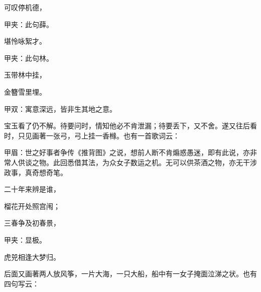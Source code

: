 \begin{poem}

    \begin{pl}可叹停机德，\end{pl}\begin{note}甲夹：此句薛。\end{note}

    \begin{pl}堪怜咏絮才。\end{pl}\begin{note}甲夹：此句林。\end{note}

    \begin{pl}玉带林中挂，\end{pl}

    \begin{pl}金簪雪里埋。\end{pl}\begin{note}甲双：寓意深远，皆非生其地之意。\end{note}

\end{poem}
\begin{parag}

    宝玉看了仍不解。待要问时，情知他必不肯泄漏；待要丢下，又不舍。遂又往后看时，只见画著一张弓，弓上挂一香橼。也有一首歌词云：\begin{note}甲眉：世之好事者争传《推背图》之说，想前人断不肯煽惑愚迷，即有此说，亦非常人供谈之物。此回悉借其法，为众女子数运之机。无可以供茶酒之物，亦无干涉政事，真奇想奇笔。\end{note}
\end{parag}

\begin{poem}
    \begin{pl}二十年来辨是谁，\end{pl}

    \begin{pl}榴花开处照宫闱；\end{pl}

    \begin{pl}三春争及初春景，\end{pl}\begin{note}甲夹：显极。\end{note}

    \begin{pl}虎兕相逢大梦归。\end{pl}
\end{poem}

\begin{parag}

    后面又画著两人放风筝，一片大海，一只大船，船中有一女子掩面泣涕之状。也有四句写云：
\end{parag}

